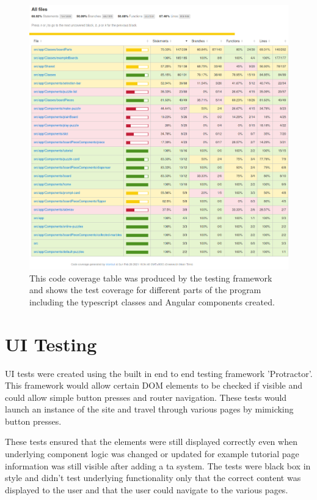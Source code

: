 \documentclass{l4proj}
\begin{document}
\begin{figure}
    \centering
    \includegraphics[width=1\linewidth]{images/codeCoverage.png}
    
    \caption{This code coverage table was produced by the testing framework and shows the test coverage for different parts of the program including the typescript classes and Angular components created.}
    
    \label{fig:codeCoverage}
\end{figure}

\section{UI Testing}
UI tests were created using the built in end to end testing framework 'Protractor'. This framework would allow certain DOM elements to be checked if visible and could allow simple button presses and router navigation. These tests would launch an instance of the site and travel through various pages by mimicking button presses. 

These tests ensured that the elements were still displayed correctly even when underlying component logic was changed or updated for example tutorial page information was still visible after adding a ta system. The tests were black box in style and didn't test underlying functionality only that the correct content was displayed to the user and that the user could navigate to the various pages. 
\end{document}
